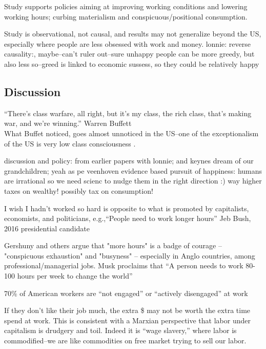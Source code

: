 \documentclass[10pt, letterpaper]{article}
\begin{document}
\begin{spacing}{1.8}
Study supports policies aiming at
improving working conditions and lowering working hours; curbing materialism and
conspicuous/positional consumption. 

Study is observational, not causal, and results may not generalize beyond the
US, especially where people are less obsessed with work and money. lonnie:
reverse causality:, maybe--can't ruler out--sure unhappy people can be more
greedy, but also less so--greed is linked to economic sussess, so they could be
relatively happy 

\subsection{Discussion}

``There's class warfare, all right, but it's my class, the rich class, that's
 making war, and we're winning.'' Warren Buffett\\

What Buffet noticed,  goes almost unnoticed in the US--one of the
exceptionalism  of the US is very low class consciousness
 \citep{lipset97, lipset00}.

discussion  and policy: from earlier papers with lonnie; and keynes dream of our grandchildren; yeah as pe veenhoven evidence based pursuit of happiness: humans are irrational so we need scienc to nudge them in the right direction :)
way higher taxes on wealthy! possibly tax on consumption!


I wish I hadn't worked so hard is opposite to what is promoted by capitalists,
economists, and politicians, e.g.,``People need to work longer hours'' Jeb Bush, 2016 presidential candidate \citep{smithABC15jul8}


Gershuny and others argue that "more hours" is a badge of courage -- "conspicuous exhaustion" and "busyness" -- especially in Anglo countries, among professional/managerial jobs. 
Musk proclaims that ``A person needs to work 80-100 hours per week to change the world''  \citep{muskIN18nov26}


70\% of American workers are ``not engaged'' or ``actively disengaged'' at
work \citep[][]{harvey14}

If they don't like their job much, the extra \$ may not be worth the extra
time spend at work. This is consistent with a Marxian perspective that labor
under capitalism is drudgery and toil. Indeed it is ``wage slavery,'' where
labor is commodified--we are like commodities on free market trying to sell our labor. 



\end{spacing}
\end{document}
